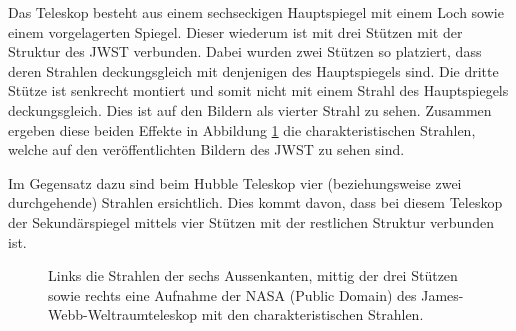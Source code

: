 Das Teleskop besteht aus einem sechseckigen Hauptspiegel mit einem Loch sowie einem vorgelagerten Spiegel.
Dieser wiederum ist mit drei Stützen mit der Struktur des JWST verbunden.
Dabei wurden zwei Stützen so platziert, dass deren Strahlen deckungsgleich mit denjenigen des Hauptspiegels sind.
Die dritte Stütze ist senkrecht montiert und somit nicht mit einem Strahl des Hauptspiegels deckungsgleich.
Dies ist auf den Bildern als vierter Strahl zu sehen.
Zusammen ergeben diese beiden Effekte in Abbildung \ref{opt:fig:jwst} die charakteristischen Strahlen, welche auf
den veröffentlichten Bildern des JWST zu sehen sind.

Im Gegensatz dazu sind beim Hubble Teleskop vier (beziehungsweise zwei durchgehende) Strahlen ersichtlich.
Dies kommt davon, dass bei diesem Teleskop der Sekundärspiegel mittels vier Stützen mit der restlichen Struktur verbunden ist.

\begin{figure}
    \centering

    \hfill
    \hfill
    \caption{Links die Strahlen der sechs Aussenkanten, mittig der drei Stützen sowie rechts eine Aufnahme der NASA (Public Domain)
        des James-Webb-Weltraumteleskop mit den charakteristischen Strahlen.}
    \label{opt:fig:jwst}
\end{figure}
